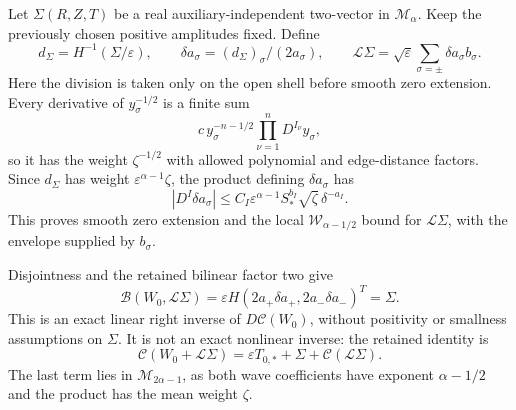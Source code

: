 \documentclass[10pt,a4paper]{article}
\begin{document}
Let \(\Sigma(R,Z,T)\) be a real auxiliary-independent two-vector in \(\mathcal M_\alpha\). Keep the previously chosen positive amplitudes fixed. Define \[
d_\Sigma=H^{-1}(\Sigma/\varepsilon),\qquad
\delta a_\sigma=(d_\Sigma)_\sigma/(2a_\sigma),\qquad
\mathcal L\Sigma=\sqrt\varepsilon\sum_{\sigma=\pm}\delta a_\sigma b_\sigma.
\] Here the division is taken only on the open shell before smooth zero extension. Every derivative of \(y_\sigma^{-1/2}\) is a finite sum \[
c\,y_\sigma^{-n-1/2}\prod_{\nu=1}^nD^{I_\nu}y_\sigma,
\] so it has the weight \(\zeta^{-1/2}\) with allowed polynomial and edge-distance factors. Since \(d_\Sigma\) has weight \(\varepsilon^{\alpha-1}\zeta\), the product defining \(\delta a_\sigma\) has \[
|D^I\delta a_\sigma|
\le C_I\varepsilon^{\alpha-1}S_*^{b_I}\sqrt\zeta\,\delta^{-a_I}.
\] This proves smooth zero extension and the local \(\mathcal W_{\alpha-1/2}\) bound for \(\mathcal L\Sigma\), with the envelope supplied by \(b_\sigma\).

Disjointness and the retained bilinear factor two give \[
\mathcal B(W_0,\mathcal L\Sigma)
=\varepsilon H(2a_+\delta a_+,2a_-\delta a_-)^T
=\Sigma.
\] This is an exact linear right inverse of \(D\mathcal C(W_0)\), without positivity or smallness assumptions on \(\Sigma\). It is not an exact nonlinear inverse: the retained identity is \[
\mathcal C(W_0+\mathcal L\Sigma)
=\varepsilon T_{0,*}+\Sigma+\mathcal C(\mathcal L\Sigma).
\] The last term lies in \(\mathcal M_{2\alpha-1}\), as both wave coefficients have exponent \(\alpha-1/2\) and the product has the mean weight \(\zeta\).
\end{document}
